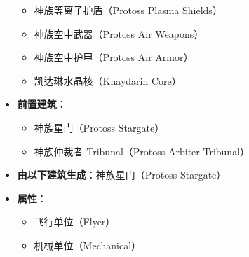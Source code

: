 \begin{tcolorbox}[colback=white, colframe=black!60!white, title=Protoss\_Arbiter(), arc=0mm]
\begin{itemize}
            \begin{itemize}
                \item 神族等离子护盾（Protoss Plasma Shields）
                \item 神族空中武器（Protoss Air Weapons）
                \item 神族空中护甲（Protoss Air Armor）
                \item 凯达琳水晶核（Khaydarin Core）
            \end{itemize}
        \item \textbf{前置建筑}：
            \begin{itemize}
                \item 神族星门（Protoss Stargate）
                \item 神族仲裁者 Tribunal（Protoss Arbiter Tribunal）
            \end{itemize}
        \item \textbf{由以下建筑生成}：神族星门（Protoss Stargate）
        \item \textbf{属性}：
            \begin{itemize}
                \item 飞行单位（Flyer）
                \item 机械单位（Mechanical）
            \end{itemize}
    \end{itemize}
\end{tcolorbox}

